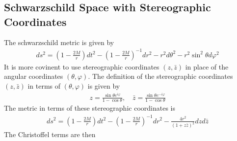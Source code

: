 \documentclass[12pt]{article}
\begin{document}
\subsection{Schwarzschild Space with Stereographic Coordinates}
The schwarzschild metric is given by
\begin{gather}
ds^{2}
=
(1 - \frac{2 M}{r})
dt^{2}
-
(1 - \frac{2 M}{r})^{-1}
dr^{2}
-
r^{2}
d\theta^{2}
-
r^{2} \sin^{2}\theta
d\varphi^{2}
\end{gather}
It is more covinent to use stereographic coordinates $(z,\bar{z})$ in place of the angular coordinates $(\theta,\varphi)$. The definition of the stereographic coordinates $(z,\bar{z})$ in terms of $(\theta,\varphi)$ is given by
\begin{gather}
z
=
\frac{\sin \theta e^{i \varphi}}{1 - \cos \theta}
,
\quad
\bar{z}
=
\frac{\sin \theta e^{-i \varphi}}{1 - \cos \theta}
\end{gather}
The metric in terms of these stereographic coordinates is
\begin{gather}
ds^{2}
=
(1 - \frac{2 M}{r}) dt^{2}
-
(1 - \frac{2 M}{r})^{-1}
dr^{2}
-
\frac{4 r^{2}}{(1 + z \bar{z})^{2}}
dz
d\bar{z}
\end{gather}
The Christoffel terms are then
\end{document}
